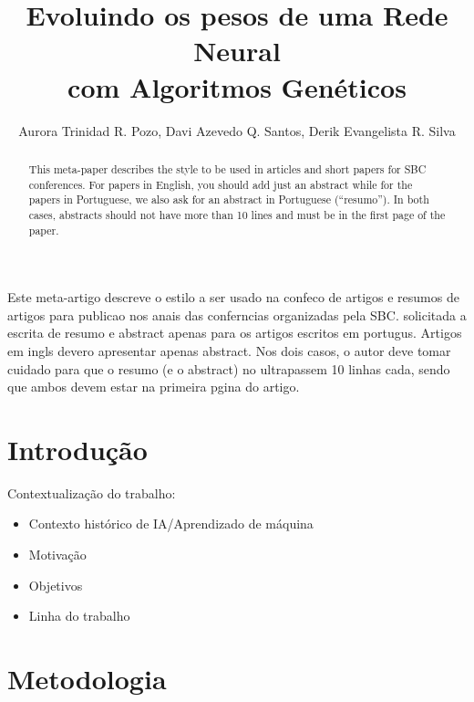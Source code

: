 \documentclass[12pt]{article}
\title{Evoluindo os pesos de uma Rede Neural \\com Algoritmos Genéticos}
\author{Aurora Trinidad R. Pozo\inst{1}, Davi Azevedo Q. Santos\inst{1}, Derik Evangelista R. Silva\inst{1}}
\begin{document}
 

\maketitle

\begin{abstract}
  This meta-paper describes the style to be used in articles and short papers
  for SBC conferences. For papers in English, you should add just an abstract
  while for the papers in Portuguese, we also ask for an abstract in
  Portuguese (``resumo''). In both cases, abstracts should not have more than
  10 lines and must be in the first page of the paper.
\end{abstract}
     
\begin{resumo} 
  Este meta-artigo descreve o estilo a ser usado na confeco de artigos e
  resumos de artigos para publicao nos anais das conferncias organizadas
  pela SBC.  solicitada a escrita de resumo e abstract apenas para os artigos
  escritos em portugus. Artigos em ingls devero apresentar apenas abstract.
  Nos dois casos, o autor deve tomar cuidado para que o resumo (e o abstract)
  no ultrapassem 10 linhas cada, sendo que ambos devem estar na primeira
  pgina do artigo.
\end{resumo}















\section{Introdução}

Contextualização do trabalho: 
\begin{itemize}
\item Contexto histórico de IA/Aprendizado de máquina
\item Motivação
\item Objetivos
\item Linha do trabalho
\end{itemize}

\section{Metodologia} \label{sec:metodologia}
\end{document}
